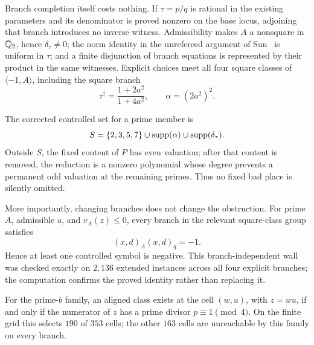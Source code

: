 Branch completion itself costs nothing.  If $\tau=p/q$ is rational in the
existing parameters and its denominator is proved nonzero on the base
locus, adjoining that branch introduces no inverse witness.  Admissibility
makes $A$ a nonsquare in $\mathbb{Q}_2$, hence $\delta_\tau\ne0$; the norm identity
in the unrefereed argument of Sun~\cite{sun} is uniform in $\tau$; and a
finite disjunction of branch equations is represented by their product in
the same witnesses.  Explicit choices meet all four square classes of
$\langle-1,A\rangle$, including the square branch
\[
 \tau^\dagger=\frac{1+2a^2}{1+4a^2},\qquad
 \alpha=(2a^2)^2.
\]

The corrected controlled set for a prime member is
\[
 S=\{2,3,5,7\}\cup\operatorname{supp}(\alpha)\cup\operatorname{supp}(\delta_\tau).
\]
Outside $S$, the fixed content of $P$ has even valuation; after that content
is removed, the reduction is a nonzero polynomial whose degree prevents a
permanent odd valuation at the remaining primes.  Thus no fixed bad place is
silently omitted.

More importantly, changing branches does not change the obstruction.  For
prime $A$, admissible $a$, and $v_A(z)\le0$, every branch in the relevant
square-class group satisfies
\[
 (x,d)_A(x,d)_q=-1.
\]
Hence at least one controlled symbol is negative.  This branch-independent
wall was checked exactly on $2{,}136$ extended instances across all four
explicit branches; the computation confirms the proved identity rather than
replacing it.

\begin{theorem}
For the prime-$b$ family, an aligned class exists at the cell $(w,u)$, with
$z=wu$, if and only if the numerator of $z$ has a prime divisor
$p\equiv1\pmod4$.  On the finite grid this selects $190$ of $353$ cells; the
other $163$ cells are unreachable by this family on every branch.
\end{theorem}

